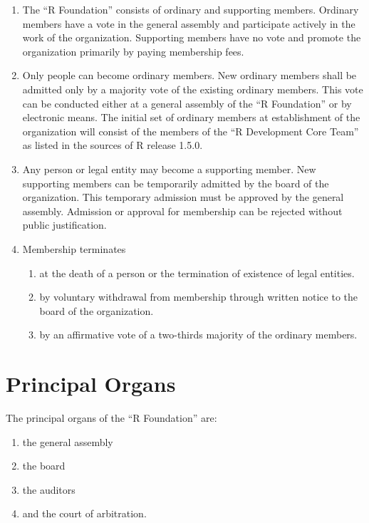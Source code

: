 \documentclass[a4paper]{article}
\newcommand{\RF}{``R Foundation''}
\begin{document}
\begin{enumerate}
 \item The \RF{} consists of ordinary and supporting
  members.  Ordinary members have a vote in the general assembly and
  participate actively in the work of the organization. Supporting
  members have no vote and promote the organization primarily by
  paying membership fees.
  
 \item Only people can become ordinary members. New ordinary
  members shall be admitted only by a majority vote of the existing
  ordinary members. This vote can be conducted either at a general
  assembly of the \RF{} or by electronic means.  The
  initial set of ordinary members at establishment of the organization
  will consist of the members of the ``R Development Core Team'' as
  listed in the sources of R release 1.5.0.
  
 \item Any person or legal entity may become a supporting member.  New
  supporting members can be temporarily admitted by the board of the
  organization.  This temporary admission must be approved by the
  general assembly.  Admission or approval for membership can be
  rejected without public justification.

 \item Membership terminates
  \begin{enumerate}
   \item at the death of a person or the termination of
    existence of legal entities.
   \item by voluntary withdrawal from membership through written
    notice to the board of the organization.
   \item by an affirmative vote of a two-thirds majority of the
    ordinary members. 
  \end{enumerate}
\end{enumerate}
   

\section{Principal Organs}

The principal organs of the \RF{} are: 
\begin{enumerate}
 \item the general assembly
 \item the board
 \item the auditors
 \item and the court of arbitration.
\end{enumerate}
\end{document}

